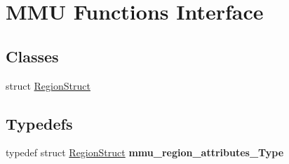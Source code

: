 \hypertarget{group__MMU__Functions}{}\section{M\+MU Functions Interface}
\label{group__MMU__Functions}
\subsection*{Classes}
\begin{DoxyCompactItemize}
\item 
struct \hyperlink{structRegionStruct}{Region\+Struct}
\end{DoxyCompactItemize}
\subsection*{Typedefs}
\begin{DoxyCompactItemize}
\item 
typedef struct \hyperlink{structRegionStruct}{Region\+Struct} {\bfseries mmu\+\_\+region\+\_\+attributes\+\_\+\+Type}\hypertarget{group__MMU__Functions_gad9e25908bfe54c82c1757bfbde67315e}{}\label{group__MMU__Functions_gad9e25908bfe54c82c1757bfbde67315e}

\end{DoxyCompactItemize}

